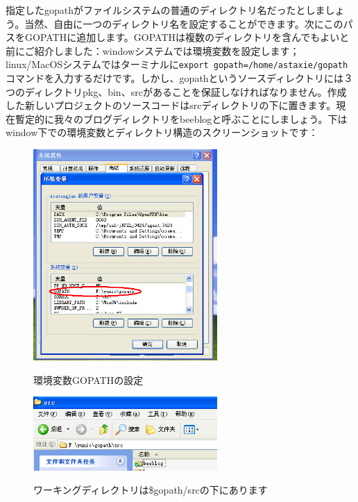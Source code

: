指定したgopathがファイルシステムの普通のディレクトリ名だったとしましょう。当然、自由に一つのディレクトリ名を設定することができます。次にこのパスをGOPATHに追加します。GOPATHは複数のディレクトリを含んでもよいと前にご紹介しました：windowシステムでは環境変数を設定します；linux/MacOSシステムではターミナルに\texttt{export gopath=/home/astaxie/gopath}コマンドを入力するだけです。しかし、gopathというソースディレクトリには３つのディレクトリpkg、bin、srcがあることを保証しなければなりません。作成した新しいプロジェクトのソースコードはsrcディレクトリの下に置きます。現在暫定的に我々のブログディレクトリをbeeblogと呼ぶことにしましょう。下はwindow下での環境変数とディレクトリ構造のスクリーンショットです：

\begin{figure}[H]
   \includegraphics[width=7cm]{13.1.gopath.png}
   \label{図13.1}
   \caption{環境変数GOPATHの設定}
\end{figure}

\begin{figure}[H]
   \includegraphics[width=7cm]{13.1.gopath2.png}
   \label{図13.2}
   \caption{ワーキングディレクトリは\$gopath/srcの下にあります}
\end{figure}


